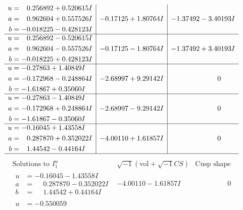 \documentclass[1p]{elsarticle_modified}
\theoremstyle{definition}
\newcommand{\I}{\sqrt{-1}}
\begin{document}
$$\begin{array}{c|c|c}
\begin{aligned}
u &= \phantom{-}0.256892 + 0.520615 I \\
a &= \phantom{-}0.962604 + 0.557526 I \\
b &= -0.018225 - 0.428123 I\end{aligned}
 & -0.17125 + 1.80764 I & -1.37492 - 3.40193 I \\ \hline\begin{aligned}
u &= \phantom{-}0.256892 - 0.520615 I \\
a &= \phantom{-}0.962604 - 0.557526 I \\
b &= -0.018225 + 0.428123 I\end{aligned}
 & -0.17125 - 1.80764 I & -1.37492 + 3.40193 I \\ \hline\begin{aligned}
u &= -0.27863 + 1.40849 I \\
a &= -0.172968 - 0.248864 I \\
b &= -1.61867 + 0.35060 I\end{aligned}
 & -2.68997 + 9.29142 I & \phantom{-0.000000 } 0 \\ \hline\begin{aligned}
u &= -0.27863 - 1.40849 I \\
a &= -0.172968 + 0.248864 I \\
b &= -1.61867 - 0.35060 I\end{aligned}
 & -2.68997 - 9.29142 I & \phantom{-0.000000 } 0 \\ \hline\begin{aligned}
u &= -0.16045 + 1.43558 I \\
a &= \phantom{-}0.287870 + 0.352022 I \\
b &= \phantom{-}1.44542 - 0.44164 I\end{aligned}
 & -4.00110 + 1.61857 I & \phantom{-0.000000 } 0\\
 \hline 
 \end{array}$$\newpage$$\begin{array}{c|c|c}  
\text{Solutions to }I^u_{1}& \I (\text{vol} + \sqrt{-1}CS) & \text{Cusp shape}\\
 \hline 
\begin{aligned}
u &= -0.16045 - 1.43558 I \\
a &= \phantom{-}0.287870 - 0.352022 I \\
b &= \phantom{-}1.44542 + 0.44164 I\end{aligned}
 & -4.00110 - 1.61857 I & \phantom{-0.000000 } 0 \\ \hline\begin{aligned}
u &= -0.550059\phantom{ +0.000000I} \\

\end{aligned}
\end{array}$$
\end{document}

